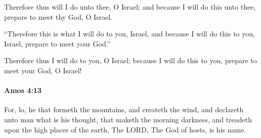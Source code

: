 			\begin{versebox}
					\item[BHS] 
					\item[LXX] 
					\item[ASV] Therefore thus will I do unto thee, O Israel; and because I will do this unto thee, prepare to meet thy God, O Israel.
					\item[NIV] “Therefore this is what I will do to you, Israel, and because I will do this to you, Israel, prepare to meet your God.”
					\item[NRSV] Therefore thus I will do to you, O Israel; because I will do this to you, prepare to meet your God, O Israel!
			\end{versebox}

		\paragraph{Amos 4:13} %
			\label{AMOS-4-13}

			For, lo, he that formeth the mountains, and createth the wind, and declareth unto man what is his thought, that maketh the morning darkness, and treadeth upon the high places of the earth, The LORD, The God of hosts, is his name.

